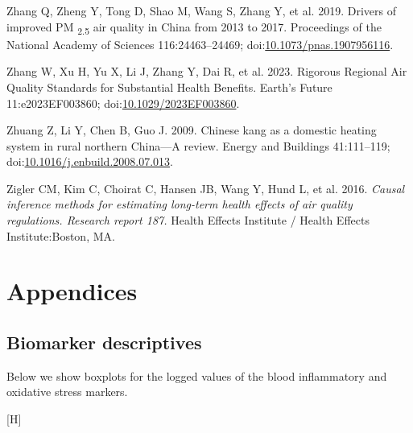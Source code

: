 \documentclass[
  letterpaper,
  DIV=11,
  numbers=noendperiod]{scrartcl}
\makeatletter
\newlength{\cslhangindent}
\newenvironment{CSLReferences}[2] %
 {\begin{list}{}{%
  \setlength{\itemindent}{0pt}
  \setlength{\leftmargin}{0pt}
  \setlength{\parsep}{0pt}
  \ifodd #1
   \setlength{\leftmargin}{\cslhangindent}
   \setlength{\itemindent}{-1\cslhangindent}
  \fi
  \setlength{\itemsep}{#2\baselineskip}}}
 {\end{list}}
\renewenvironment{figure}%
   {\renewcommand\familydefault\sfdefault
    \@float{figure}}
   {\end@float}
\makeatother
\begin{document}
\begin{CSLReferences}{1}{1}
Zhang Q, Zheng Y, Tong D, Shao M, Wang S, Zhang Y, et al. 2019. Drivers
of improved {PM} {\textsubscript{2.5}} air quality in {China} from 2013
to 2017. Proceedings of the National Academy of Sciences
116:24463--24469;
doi:\href{https://doi.org/10.1073/pnas.1907956116}{10.1073/pnas.1907956116}.

Zhang W, Xu H, Yu X, Li J, Zhang Y, Dai R, et al. 2023. Rigorous
{Regional Air Quality Standards} for {Substantial Health Benefits}.
Earth's Future 11:e2023EF003860;
doi:\href{https://doi.org/10.1029/2023EF003860}{10.1029/2023EF003860}.

Zhuang Z, Li Y, Chen B, Guo J. 2009. Chinese kang as a domestic heating
system in rural northern {China}---{A} review. Energy and Buildings
41:111--119;
doi:\href{https://doi.org/10.1016/j.enbuild.2008.07.013}{10.1016/j.enbuild.2008.07.013}.

Zigler CM, Kim C, Choirat C, Hansen JB, Wang Y, Hund L, et al. 2016.
\emph{Causal inference methods for estimating long-term health effects
of air quality regulations. {Research} report 187.} Health Effects
Institute / Health Effects Institute:Boston, MA.

\end{CSLReferences}

\newpage
\appendix
\renewcommand{\thefigure}{A\arabic{figure}}
\renewcommand{\thetable}{A\arabic{table}}
\setcounter{figure}{0}
\setcounter{table}{0}

\section{Appendices}\label{appendices}

\subsection{Biomarker descriptives}\label{biomarker-descriptives}

Below we show boxplots for the logged values of the blood inflammatory
and oxidative stress markers.

\begin{figure}[H]

\caption{\label{fig-afig-biomarkers}Boxplots for markers of systemic
inflammation including C-reactive protein (CRP), interleukin-6 (IL-6),
tumour necrosis factor alpha (TNF-\(\alpha\)) and markers of oxidative
stress including 8-hydroxy-2'-deoxyguanosine (8-OHdG) and
malondialdehyde (MDA)}


\end{figure}%
\end{document}
